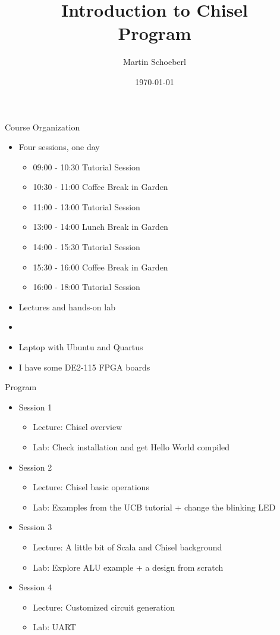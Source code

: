 \documentclass[xcolor=pdflatex,dvipsnames,table]{beamer}
\title{Introduction to Chisel\\Program}
\author{Martin Schoeberl}
\date{\today}
\institute{Technical University of Denmark}
\begin{document}
\begin{frame}
\titlepage
\end{frame}


\begin{frame}[fragile]{Course Organization}
\begin{itemize}
\item Four sessions, one day
\begin{itemize}
\item	09:00 - 10:30	Tutorial Session
\item	10:30 - 11:00	Coffee Break in Garden
\item	11:00 - 13:00	Tutorial Session
\item	13:00 - 14:00	Lunch Break in Garden
\item	14:00 - 15:30	Tutorial Session
\item	15:30 - 16:00	Coffee Break in Garden
\item	16:00 - 18:00	Tutorial Session
\end{itemize}
\item Lectures and hands-on lab
\item 
\item Laptop with Ubuntu and Quartus
\item I have some DE2-115 FPGA boards
\end{itemize}
\end{frame}

\begin{frame}[fragile]{Program}
\begin{itemize}
\item Session 1
\begin{itemize}
\item Lecture: Chisel overview
\item Lab: Check installation and get Hello World compiled
\end{itemize}
\item Session 2
\begin{itemize}
\item Lecture: Chisel basic operations
\item Lab: Examples from the UCB tutorial + change the blinking LED
\end{itemize}
\item Session 3
\begin{itemize}
\item Lecture: A little bit of Scala and Chisel background 
\item Lab: Explore ALU example + a design from scratch
\end{itemize}
\item Session 4
\begin{itemize}
\item Lecture: Customized circuit generation
\item Lab: UART
\end{itemize}
\end{itemize}
\end{frame}
\end{document}
